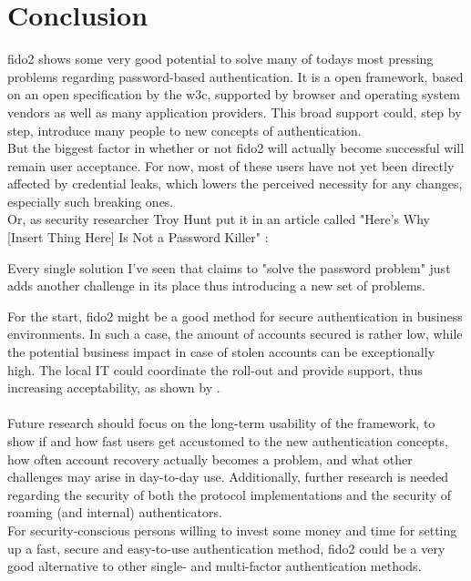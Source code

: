 
\section{Conclusion}
\label{sec:conclusion}

\ac{fido2} shows some very good potential to solve many of todays most pressing problems regarding password-based authentication. It is a open framework, based on an open specification by the \ac{w3c}, supported by browser and operating system vendors as well as many application providers. This broad support could, step by step, introduce many people to new concepts of authentication.\\
But the biggest factor in whether or not \ac{fido2} will actually become successful will remain user acceptance. For now, most of these users have not yet been directly affected by credential leaks, which lowers the perceived necessity for any changes, especially such breaking ones.\\
Or, as security researcher Troy Hunt put it in an article called "Here's Why [Insert Thing Here] Is Not a Password Killer" \cite{hunt2018a}:

\begin{displayquote}
    Every single solution I've seen that claims to "solve the password problem" just adds another challenge in its place thus introducing a new set of problems.
\end{displayquote}

\noindent For the start, \ac{fido2} might be a good method for secure authentication in business environments. In such a case, the amount of accounts secured is rather low, while the potential business impact in case of stolen accounts can be exceptionally high. The local IT could coordinate the roll-out and provide support, thus increasing acceptability, as shown by \cite{lang2017}.\\
\\
Future research should focus on the long-term usability of the framework, to show if and how fast users get accustomed to the new authentication concepts, how often account recovery actually becomes a problem, and what other challenges may arise in day-to-day use. Additionally, further research is needed regarding the security of both the protocol implementations and the security of roaming (and internal) authenticators.\\

For security-conscious persons willing to invest some money and time for setting up a fast, secure and easy-to-use authentication method, \ac{fido2} could be a very good alternative to other single- and multi-factor authentication methods.